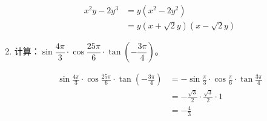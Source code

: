 \documentclass[answers]{exam}
\begin{document}
\begin{questions}
\begin{enumerate}[label=(\arabic*)]
		      \begin{solution}
			      \begin{align*}
				      x^2y - 2y^3 & = y(x^2 - 2y^2)               \\
				                  & = y(x+\sqrt{2}y)(x-\sqrt{2}y)
			      \end{align*}
		      \end{solution}
		\item 计算：$\sin\dfrac{4\pi}{3}\cdot\cos\dfrac{25\pi}{6}\cdot\tan\left(-\dfrac{3\pi}{4}\right)$。
		      \begin{solution}
			      \begin{align*}
				      \sin\frac{4\pi}{3}\cdot\cos\frac{25\pi}{6}\cdot\tan\left(-\frac{3\pi}{4}\right)
				       & = -\sin\frac{\pi}{3}\cdot\cos\frac{\pi}{6}\cdot \tan\frac{3\pi}{4} \\
				       & = -\frac{\sqrt{3}}{2} \cdot \frac{\sqrt{3}}{2} \cdot 1             \\
				       & = - \frac43
			      \end{align*}
		      \end{solution}
	\end{enumerate}

\end{questions}
\end{document}
